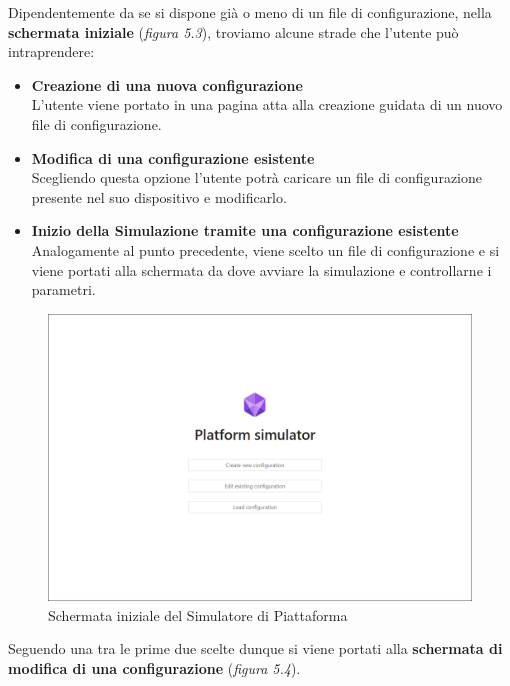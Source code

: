 \noindent Dipendentemente da se si dispone già o meno di un file di configurazione, nella {\bf schermata iniziale} (\emph{figura 5.3}), troviamo alcune strade che l'utente può intraprendere:
\vspace{20mm}
\begin{itemize}
    \item {\bf Creazione di una nuova configurazione}\\
    {L'utente viene portato in una pagina atta alla creazione guidata di un nuovo file di configurazione.}
    \item {\bf Modifica di una configurazione esistente}\\
    {Scegliendo questa opzione l'utente potrà caricare un file di configurazione presente nel suo dispositivo e modificarlo.}
    \item {\bf Inizio della Simulazione tramite una configurazione esistente}\\
    {Analogamente al punto precedente, viene scelto un file di configurazione e si viene portati alla schermata da dove avviare la simulazione e controllarne i parametri.}
\end{itemize}
\vspace{5mm}
\begin{figure}[H]
    \centering
    \includegraphics[width=1.0\textwidth]{img/simulator_home_screenshot.png}
    \caption{Schermata iniziale del Simulatore di Piattaforma}
\end{figure}
\vspace{5mm}
Seguendo una tra le prime due scelte dunque si viene portati alla {\bf schermata di modifica di una configurazione} (\emph{figura 5.4}).\newline

